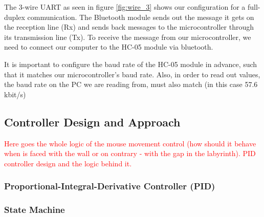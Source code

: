 The 3-wire UART as seen in figure \ref{fig:wire_3} shows our configuration for a full-duplex communication. The Bluetooth module sends out the message it gets on the reception line (Rx) and sends back messages to the microcontroller through its transmission line (Tx). To receive the message from our microcontroller, we need to connect our computer to the HC-05 module via bluetooth.

It is important to configure the baud rate of the HC-05 module in advance, such that it matches our microcontroller's baud rate. Also, in order to read out values, the baud rate on the PC we are reading from, must also match (in this case 57.6 kbit/s)


\subsection{Controller Design and Approach}

\textcolor{red}{
Here goes the whole logic of the mouse movement control (how should it behave when is faced with the wall or on contrary - with the gap in the labyrinth). PID controller design and the logic behind it.
}

\subsubsection{Proportional-Integral-Derivative Controller (PID)}

\subsubsection{State Machine}



